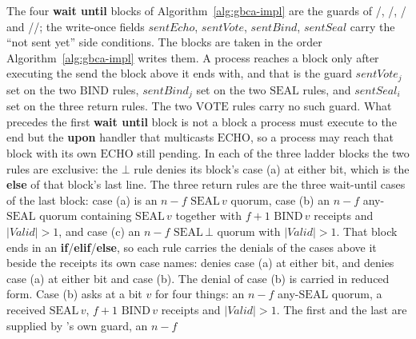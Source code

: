 The four \textbf{wait until} blocks of Algorithm~\ref{alg:gbca-impl} are the
guards of /\allowbreak{},
/\allowbreak{},
/\allowbreak{} and
/\allowbreak{}/\allowbreak{}; the write-once fields
$\mathit{sentEcho}$, $\mathit{sentVote}$, $\mathit{sentBind}$,
$\mathit{sentSeal}$ carry the ``not sent yet'' side conditions.
The blocks are taken in the order Algorithm~\ref{alg:gbca-impl} writes them.
A process reaches a block only after executing the send the block above it ends
with, and that is the guard $\mathit{sentVote}_j$ set on the two
$\mathrm{BIND}$ rules, $\mathit{sentBind}_j$ set on the two $\mathrm{SEAL}$
rules, and $\mathit{sentSeal}_i$ set on the three return rules.
The two $\mathrm{VOTE}$ rules carry no such guard.
What precedes the first \textbf{wait until} block is not a block a process must
execute to the end but the \textbf{upon} handler that multicasts
$\mathrm{ECHO}$, so a process may reach that block with its own
$\mathrm{ECHO}$ still pending.
In each of the three ladder blocks the two rules are exclusive: the $\bot$ rule
denies its block's case (a) at either bit, which is the \textbf{else} of that
block's last line.
The three return rules are the three wait-until cases of the last block:
case (a) is an $n{-}f$ $\mathrm{SEAL}\,v$ quorum, case (b) an $n{-}f$
any-$\mathrm{SEAL}$ quorum containing $\mathrm{SEAL}\,v$ together with $f{+}1$
$\mathrm{BIND}\,v$ receipts and $|\mathit{Valid}| > 1$, and case (c) an $n{-}f$
$\mathrm{SEAL}\,\bot$ quorum with $|\mathit{Valid}| > 1$.
That block ends in an \textbf{if}/\textbf{elif}/\textbf{else}, so each rule
carries the denials of the cases above it beside the receipts its own case
names:  denies case (a) at
either bit, and  denies
case (a) at either bit and case (b).
The denial of case (b) is carried in reduced form.
Case (b) asks at a bit $v$ for four things: an $n{-}f$ any-$\mathrm{SEAL}$
quorum, a received $\mathrm{SEAL}\,v$, $f{+}1$ $\mathrm{BIND}\,v$ receipts and
$|\mathit{Valid}| > 1$.
The first and the last are supplied by
's own guard, an $n{-}f$
